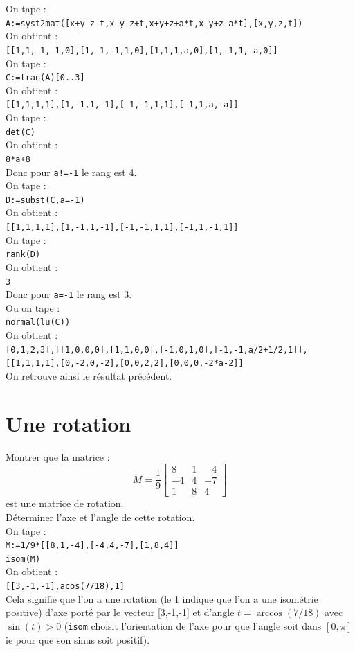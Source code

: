 \documentclass[a4paper,11pt]{book}
\begin{document}
On tape :\\
{\tt A:=syst2mat([x+y-z-t,x-y-z+t,x+y+z+a*t,x-y+z-a*t],[x,y,z,t])}\\
On obtient :\\
{\tt [[1,1,-1,-1,0],[1,-1,-1,1,0],[1,1,1,a,0],[1,-1,1,-a,0]]}\\
On tape :\\
{\tt C:=tran(A)[0..3]}\\
On obtient :\\
{\tt [[1,1,1,1],[1,-1,1,-1],[-1,-1,1,1],[-1,1,a,-a]]}\\
On tape :\\
{\tt det(C)}\\
On obtient :\\
{\tt 8*a+8}\\
Donc pour {\tt a!=-1} le rang est 4.\\
On tape :\\
{\tt D:=subst(C,a=-1)}\\
On obtient :\\
{\tt [[1,1,1,1],[1,-1,1,-1],[-1,-1,1,1],[-1,1,-1,1]]}\\
On tape :\\
{\tt rank(D)}\\
On obtient :\\
{\tt 3}\\
Donc pour {\tt a=-1} le rang est 3.\\
Ou on tape :\\
{\tt normal(lu(C))}\\
On obtient :\\
{\tt [0,1,2,3],[[1,0,0,0],[1,1,0,0],[-1,0,1,0],[-1,-1,a/2+1/2,1]],}\\
{\tt [[1,1,1,1],[0,-2,0,-2],[0,0,2,2],[0,0,0,-2*a-2]]}\\
On retrouve ainsi le r\'esultat pr\'ec\'edent.

\section{Une rotation}
Montrer que la matrice :
$$M=\frac{1}{9}
\left [\begin{array}{rrr}
8&1&-4\\
-4&4&-7\\
1&8&4 
\end{array}
\right]$$
est une matrice de rotation.\\
D\'eterminer l'axe et l'angle de cette rotation.\\
On tape :\\
{\tt M:=1/9*[[8,1,-4],[-4,4,-7],[1,8,4]]}\\
{\tt isom(M)}\\
On obtient :\\
{\tt [[3,-1,-1],acos(7/18),1]}\\
Cela signifie que l'on a une rotation (le 1 indique que l'on a une isom\'etrie 
positive) d'axe port\'e par le vecteur [3,-1,-1]
et d'angle $t=\arccos(7/18)$ avec $\sin(t)>0$ ({\tt isom} choisit l'orientation
de l'axe pour que l'angle soit dans $[0,\pi]$ ie pour que son sinus soit 
positif).
\end{document}
